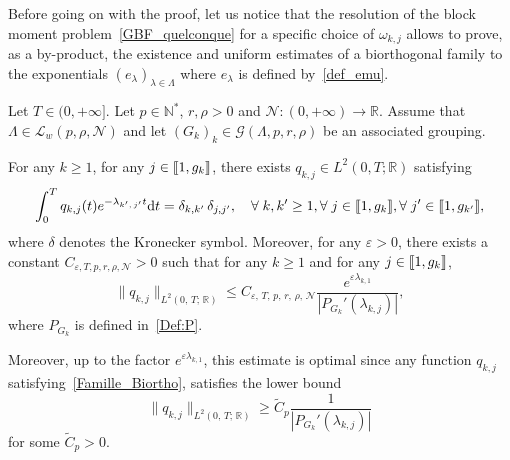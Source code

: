 \documentclass[AHL,Unicode,longabstracts]{cedram}
\newcommand{\llbracket}{\mathopen{[\mkern -2.7mu[}}
\newcommand{\rrbracket}{\mathclose{]\mkern -2.7mu]}}
\newcommand{\inter}[2]{\llbracket #1,#2 \rrbracket}
\newcommand{\n}{g}
\newcommand{\LL}{\mathcal{L}}
\newcommand{\NN}{\mathcal{N}}
\newcommand{\N}{\mathbb{N}}
\newcommand{\R}{\mathbb{R}}
\newcommand{\md}{\mathrm{d}}
\let\oldforall\forall
\renewcommand*{\forall}{\mathrel{\oldforall}}
\begin{document}
Before going on with the proof, let us notice that the resolution of the block moment problem~\eqref{GBF_quelconque} for a specific choice of $\omega_{k,j}$ allows to prove, as a by-product, the existence and uniform estimates of a biorthogonal family to the exponentials $(e_\lambda)_{ \lambda \in \Lambda}$ where $e_\lambda$ is defined by~\eqref{def_emu}.
\begin{coro} \label{Coro:FamilleBiorthogonale}
Let $T \in (0,+\infty]$. Let $p \in \N^*$, $r, \rho > 0$ and $\NN : (0,+\infty) \to \R$. Assume that $\Lambda \in \LL_w(p,\rho, \NN)$ and let $(G_k)_k\in \mathcal{G}(\Lambda,p,r,\rho)$ be an associated grouping.

For any $k \geq 1$, for any $j \in \inter{1}{\n_k}$, there exists $q_{k,j} \in L^2(0,T ; \R)$ satisfying
\begin{equation}\label{Famille_Biortho}
\int_0^T q_{k,j}(t) e^{-\lambda_{k',\,j'} t } \md t = \delta_{k,k'}\,\delta_{j,j'}, \quad \forall k, k' \geq 1, \forall j \in \inter{1}{\n_{k}}, \forall j' \in \inter{1}{\n_{k'}},
\end{equation}
where $\delta$ denotes the Kronecker symbol. Moreover, for any $\varepsilon > 0$, there exists a constant $C_{\varepsilon, T, p, r, \rho, \NN} >0$ such that for any $k \geq 1$ and for any $j \in \inter{1}{\n_k}$,
\begin{equation*}\label{Estimee_Famille_Biortho}
\| q_{k,j} \|_{L^2(0,\,T ;\,\R)} \leq C_{\varepsilon,\,T,\,p,\,r,\,\rho,\,\NN} \frac{e^{\varepsilon \lambda_{k,1}}}{\left| P_{G_k}'(\lambda_{k,j}) \right| },
\end{equation*}
where $P_{G_k}$ is defined in~\eqref{Def:P}.

Moreover, up to the factor $e^{\varepsilon \lambda_{k,1}}$, this estimate is optimal since any function $q_{k,j}$ satisfying~\eqref{Famille_Biortho}, satisfies the lower bound
\[
\| q_{k,j} \|_{L^2(0,\,T ;\,\R)} \geq \widetilde{C}_{p} \frac{1}{\left| P_{G_k}'(\lambda_{k,j}) \right| }
\]
for some $\widetilde{C}_p >0$.
\end{coro}
\end{document}
